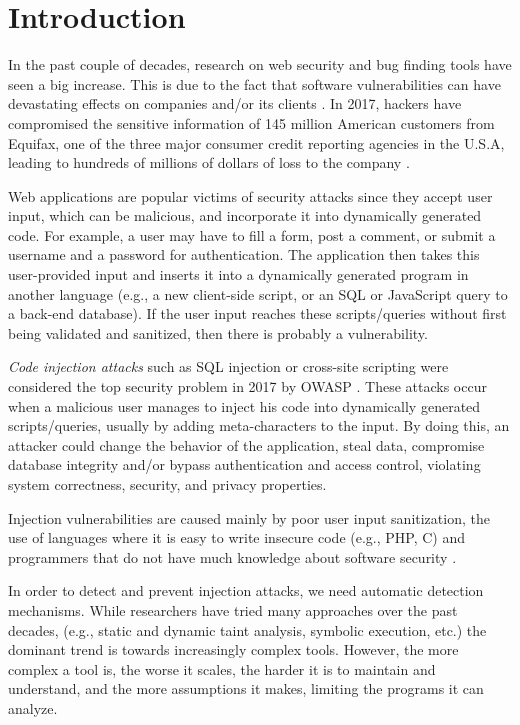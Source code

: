 \section{Introduction}
In the past couple of decades, research on web security and bug finding tools have seen a big increase. This is due to the fact that software vulnerabilities can have devastating effects on companies and/or its clients \cite{telang2007empirical}. In 2017, hackers have compromised the sensitive information of 145 million American customers from Equifax, one of the three major consumer credit reporting agencies in the U.S.A, leading to hundreds of millions of dollars of loss to the company \cite{equifax}.

Web applications are popular victims of security attacks since they accept user input, which can be malicious, and incorporate it into dynamically generated code. 
For example, a user may have to fill a form, post a comment, or submit a username and a password for authentication. 
The application then takes this user-provided input and inserts it into a dynamically generated program in another language (e.g., a new client-side script, or an SQL or JavaScript query to a back-end database). If the user input reaches these scripts/queries without first being validated and sanitized, then there is probably a vulnerability.

\textit{Code injection attacks} such as SQL injection or cross-site scripting were considered the top security problem in 2017 by OWASP \cite{OWASP}. These attacks occur when a malicious user manages to inject his code into dynamically generated scripts/queries, usually by adding meta-characters to the input. By doing this, an attacker could change the behavior of the application, steal data, compromise database integrity and/or bypass authentication and access control, violating system correctness, security, and privacy properties.

Injection vulnerabilities are caused mainly by poor user input sanitization, the use of languages where it is easy to write insecure code (e.g., PHP, C) and programmers that do not have much knowledge about software security \cite{jain2011review}.

In order to detect and prevent injection attacks, we need automatic detection mechanisms.
While researchers have tried many approaches over the past decades, (e.g., static and dynamic taint analysis, symbolic execution, etc.) the dominant trend is towards increasingly complex tools. However, the more complex a tool is, the worse it scales, the harder it is to maintain and understand, and the more assumptions it makes, limiting the programs it can analyze. 

